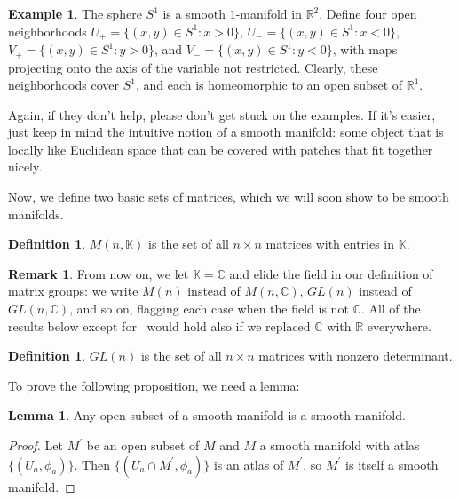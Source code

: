\documentclass[12pt]{article}
\newcommand{\C}{\mathbb{C}}
\newcommand{\R}{\mathbb{R}}
\newcommand{\K}{\mathbb{K}}
\theoremstyle{definition}
\theoremstyle{definition}
\theoremstyle{definition}
\newtheorem{lem}[them]{Lemma}
\theoremstyle{definition}
\newtheorem{rmk}[them]{Remark}
\theoremstyle{definition}
\newtheorem{defn}[them]{Definition}
\theoremstyle{definition}
\newtheorem{ex}[them]{Example}
\theoremstyle{definition}
\theoremstyle{definition}
\begin{document}
\begin{ex} 
The sphere $S^1$ is a smooth $1$-manifold in
$\R^2$. Define four open neighborhoods $U_+ =
\{(x,y) \in S^1 : x > 0\}$, $U_{-} = \{(x,y) \in
S^1 : x < 0\}$, $V_+ = \{(x,y) \in S^1 : y > 0\}$,
and $V_{-} = \{(x,y) \in S^1 : y < 0\}$, with maps
projecting onto the axis of the variable not
restricted. Clearly, these neighborhoods cover
$S^1$, and each is homeomorphic to an open subset
of $\R^1$.
\end{ex}   

\par{Again, if they don’t help, please don’t get stuck on the examples. If it’s easier, just keep in mind the intuitive notion of a smooth manifold: some object that is locally like Euclidean space that can be covered with patches that fit together nicely.}

\vspace{6pt}
\par{Now, we define two basic sets of matrices, which we will soon show to be smooth manifolds.}

\begin{defn}
$M(n,\K)$ is the set of all $n \times
n$ matrices with entries in $\K$.
\end{defn}

\begin{rmk}
From now on, we let $\K = \C$ and elide the field
in our definition of matrix groups: we write
$M(n)$ instead of $M(n, \C)$, $GL(n)$ instead of
$GL(n, \C)$, and so on, flagging each case when
the field is not $\C$. All of the results below
except for~ would hold also if we
replaced $\C$ with $\R$ everywhere.
\end{rmk}

\begin{defn}
\textbf{$GL(n)$} is the set of all
$n \times n$ matrices with nonzero determinant. 
\end{defn}

\par{To prove the following proposition, we need a lemma:}

\begin{lem}\label{lem:smooth}
Any open subset of a smooth manifold
is a smooth manifold.
\end{lem}
\begin{proof}
Let $M^\prime$ be an open subset of $M$ and
$M$ a smooth manifold with atlas $\{(U_a,
\phi_a)\}$. Then $\{(U_a \cap M^\prime, \phi_a)\}$ is
an atlas of $M^\prime$, so $M^\prime$ is
itself a smooth manifold.
\end{proof}
\end{document}

